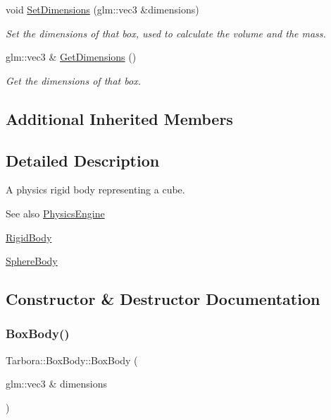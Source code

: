 \begin{DoxyCompactItemize}
void \hyperlink{classTarbora_1_1BoxBody_ae4b822b4acb781e9fdec907e8a92b27b}{Set\+Dimensions} (glm\+::vec3 \&dimensions)
\begin{DoxyCompactList}\small\item\em Set the dimensions of that box, used to calculate the volume and the mass. \end{DoxyCompactList}\item 
\mbox{\label{classTarbora_1_1BoxBody_a2c833613435aa7244e39f14460a792c6}} 
glm\+::vec3 \& \hyperlink{classTarbora_1_1BoxBody_a2c833613435aa7244e39f14460a792c6}{Get\+Dimensions} ()
\begin{DoxyCompactList}\small\item\em Get the dimensions of that box. \end{DoxyCompactList}\end{DoxyCompactItemize}
\subsection*{Additional Inherited Members}


\subsection{Detailed Description}
A physics rigid body representing a cube. 

\begin{DoxySeeAlso}{See also}
\hyperlink{classTarbora_1_1PhysicsEngine}{Physics\+Engine} 

\hyperlink{classTarbora_1_1RigidBody}{Rigid\+Body} 

\hyperlink{classTarbora_1_1SphereBody}{Sphere\+Body} 
\end{DoxySeeAlso}


\subsection{Constructor \& Destructor Documentation}
\mbox{\label{classTarbora_1_1BoxBody_a4588faa74c221c9f484432bc3b7a0674}} 
\subsubsection{\texorpdfstring{Box\+Body()}{BoxBody()}}
{\footnotesize\ttfamily Tarbora\+::\+Box\+Body\+::\+Box\+Body (\begin{DoxyParamCaption}\item[{glm\+::vec3 \&}]{dimensions }\end{DoxyParamCaption})}



